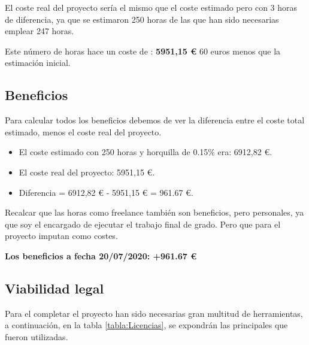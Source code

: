 El coste real del proyecto sería el mismo que el coste estimado pero con 3 horas de diferencia, ya que se estimaron 250 horas de las que han sido necesarias emplear 247 horas.

Este número de horas hace un coste de : \textbf{5951,15 €} 60 euros menos que la estimación inicial.

\subsection{Beneficios}
Para calcular todos los beneficios debemos de ver la diferencia entre el coste total estimado, menos el coste real del proyecto. 

\begin{itemize}
	\item El coste estimado con 250 horas y horquilla de 0.15\% era: 6912,82  €.
	\item El coste real del proyecto: 5951,15 €.
	\item Diferencia = 6912,82  € - 5951,15 € = 961.67 €.
\end{itemize}

Recalcar que las horas como freelance también son beneficios, pero personales, ya que soy el encargado de ejecutar el trabajo final de grado. Pero que para el proyecto imputan como costes.

\textbf{Los beneficios a fecha 20/07/2020: +961.67 €}

\subsection{Viabilidad legal}

Para el completar el proyecto han sido necesarias gran multitud de herramientas, a continuación, en la tabla \ref{tabla:Licencias}, se expondrán las principales que fueron utilizadas.


